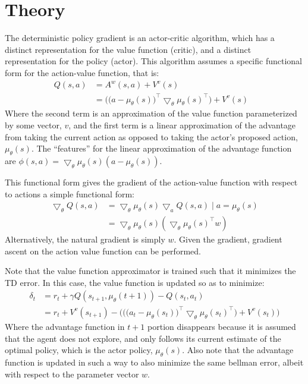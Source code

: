 \documentclass[a4paper]{article}
\begin{document}
\section{Theory}
The deterministic policy gradient is an actor-critic algorithm, which has a distinct representation for the value function (critic), and a distinct representation for the policy (actor). This algorithm assumes a specific functional form for the action-value function, that is:
\begin{align}
Q(s,a)& = A^{w}(s,a)+V^{v}(s)&\\
& = \Big(\big(a-\mu_{\theta}(s)\big)^{\top}\bigtriangledown_{\theta}\mu_{\theta}(s)^{\top}\Big) + V^{v}(s)&
\end{align}
Where the second term is an approximation of the value function parameterized by some vector, $v$, and the first term is a linear approximation of the advantage from taking the current action as opposed to taking the actor's proposed action, $\mu_{\theta}(s)$. The ``features'' for the linear approximation of the advantage function are $\phi(s,a) = \bigtriangledown_{\theta}\mu_{\theta}(s)(a-\mu_{\theta}(s))$.

This functional form gives the gradient of the action-value function with respect to actions a simple functional form:
\begin{align}
\bigtriangledown_{\theta}Q(s,a) &= \bigtriangledown_{\theta}\mu_{\theta}(s)\bigtriangledown_{a}Q(s,a)\mid a = \mu_{\theta}(s)\\
&=\bigtriangledown_{\theta}\mu_{\theta}(s)(\bigtriangledown_{\theta}\mu_{\theta}(s)^{\top}w)
\end{align}
Alternatively, the natural gradient is simply $w$. Given the gradient, gradient ascent on the action value function can be performed.


Note that the value function approximator is trained such that it minimizes the TD error. In this case, the value function is updated so as to minimize:
\begin{align}
\delta_t &= r_t +\gamma Q(s_{t+1},\mu_{\theta}(t+1)) - Q(s_t,a_t)\\
& = r_t + V^{v}(s_{t+1}) - \bigg(\Big(\big(a_t-\mu_{\theta}(s_t)\big)^{\top}\bigtriangledown_{\theta}\mu_{\theta}(s_t)^{\top}\Big) + V^{v}(s_t)\bigg)
\end{align}
Where the advantage function in $t+1$ portion disappears because it is assumed that the agent does not explore, and only follows its current estimate of the optimal policy, which is the actor policy, $\mu_{\theta}(s)$. 
Also note that the advantage function is updated in such a way to also minimize the same bellman error, albeit with respect to the parameter vector $w$.
\end{document}
